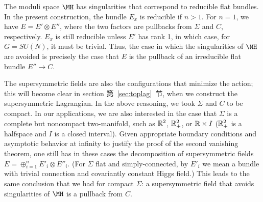 The moduli space $\MH$ has singularities that correspond to
reducible flat bundles.  In the present construction, the bundle
$E_x$ is reducible if $n>1$. For $n=1$, we have $E=E'\otimes E''$,
where the two factors are pullbacks from $\Sigma $ and $C$,
respectively.  $E_x$ is still reducible unless $E'$ has rank 1, in
which case, for $G=SU(N)$, it must be trivial.  Thus, the case in
which the singularities of $\MH$ are avoided is precisely the case
that $E$ is the pullback of an irreducible flat bundle $E''\to C$.

 The supersymmetric fields are
also the configurations that minimize the action; this will become
clear in section 第~\ref{sec:toplag}~节, when we construct the supersymmetric
Lagrangian.   In the above reasoning, we took $\Sigma$ and $C$ to
be compact.  In our applications, we are also interested in the
case that $\Sigma$ is a complete but noncompact two-manifold, such
as $\Bbb{R}^2$, $\Bbb{R}^2_+$, or $\Bbb{R}\times I$ ($\Bbb{R}^2_+$
is a halfspace and $I$ is a closed interval). Given appropriate
boundary conditions and asymptotic behavior at infinity to justify
the proof of the second vanishing theorem, one still has in these
cases the decomposition of supersymmetric fields
$E=\oplus_{i=1}^nE'_i\otimes E''_i$. (For $\Sigma$ flat and
simply-connected, by $E'_i$ we mean a bundle with trivial
connection and covariantly constant Higgs field.) This leads to
the same conclusion that we had for compact $\Sigma$: a
supersymmetric field that avoids singularities of $\MH$ is a
pullback from $C$.
